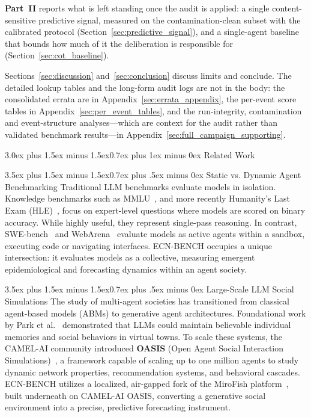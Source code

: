 \documentclass[11pt,journal,onecolumn]{IEEEtran}
\makeatletter
\renewcommand\section{\@startsection{section}{1}{\z@}%
  {3.0ex plus 1.5ex minus 1.5ex}{0.7ex plus 1ex minus 0ex}%
  {\normalfont\normalsize\centering\bfseries}}
\renewcommand\subsection{\@startsection{subsection}{2}{\z@}%
  {3.5ex plus 1.5ex minus 1.5ex}{0.7ex plus .5ex minus 0ex}%
  {\normalfont\normalsize\bfseries}}
\makeatother
\begin{document}
\textbf{Part~II} reports what is left standing once the audit is applied: a single content-sensitive predictive signal, measured on the contamination-clean subset with the calibrated protocol (Section~\ref{sec:predictive_signal}), and a single-agent baseline that bounds how much of it the deliberation is responsible for (Section~\ref{sec:cot_baseline}).

Sections~\ref{sec:discussion} and~\ref{sec:conclusion} discuss limits and conclude. The detailed lookup tables and the long-form audit logs are not in the body: the consolidated errata are in Appendix~\ref{sec:errata_appendix}, the per-event score tables in Appendix~\ref{sec:per_event_tables}, and the run-integrity, contamination and event-structure analyses---which are context for the audit rather than validated benchmark results---in Appendix~\ref{sec:full_campaign_supporting}.

\section{Related Work}
\label{sec:related}

\subsection{Static vs. Dynamic Agent Benchmarking}
Traditional LLM benchmarks evaluate models in isolation. Knowledge benchmarks such as MMLU~\cite{mmlu}, and more recently Humanity's Last Exam (HLE)~\cite{hle2024}, focus on expert-level questions where models are scored on binary accuracy. While highly useful, they represent single-pass reasoning. In contrast, SWE-bench~\cite{swebench} and WebArena~\cite{webarena2023} evaluate models as active agents within a sandbox, executing code or navigating interfaces. ECN-BENCH occupies a unique intersection: it evaluates models as a collective, measuring emergent epidemiological and forecasting dynamics within an agent society.

\subsection{Large-Scale LLM Social Simulations}
The study of multi-agent societies has transitioned from classical agent-based models (ABMs) to generative agent architectures. Foundational work by Park et al.~\cite{park2023generative} demonstrated that LLMs could maintain believable individual memories and social behaviors in virtual towns. To scale these systems, the CAMEL-AI community introduced \textbf{OASIS} (Open Agent Social Interaction Simulations)~\cite{oasis2024}, a framework capable of scaling up to one million agents to study dynamic network properties, recommendation systems, and behavioral cascades. ECN-BENCH utilizes a localized, air-gapped fork of the MiroFish platform~\cite{mirofish2024}, built underneath on CAMEL-AI OASIS, converting a generative social environment into a precise, predictive forecasting instrument.
\end{document}
